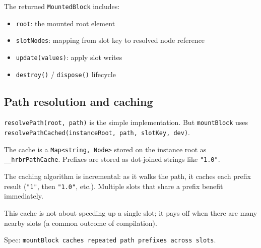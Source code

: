 The returned \texttt{MountedBlock} includes:

\begin{itemize}
  \item \texttt{root}: the mounted root element
  \item \texttt{slotNodes}: mapping from slot key to resolved node reference
  \item \texttt{update(values)}: apply slot writes
  \item \texttt{destroy()} / \texttt{dispose()} lifecycle
\end{itemize}

\subsection{Path resolution and caching}

\texttt{resolvePath(root, path)} is the simple implementation.
But \texttt{mountBlock} uses \texttt{resolvePathCached(instanceRoot, path, slotKey, dev)}.

The cache is a \texttt{Map<string, Node>} stored on the instance root as \texttt{\_\_hrbrPathCache}.
Prefixes are stored as dot-joined strings like \texttt{"1.0"}.

The caching algorithm is incremental: as it walks the path, it caches each prefix result (\texttt{"1"}, then \texttt{"1.0"}, etc.). Multiple slots that share a prefix benefit immediately.

\begin{center}
\end{center}

This cache is not about speeding up a single slot; it pays off when there are many nearby slots (a common outcome of compilation).

Spec: \texttt{mountBlock caches repeated path prefixes across slots}.


